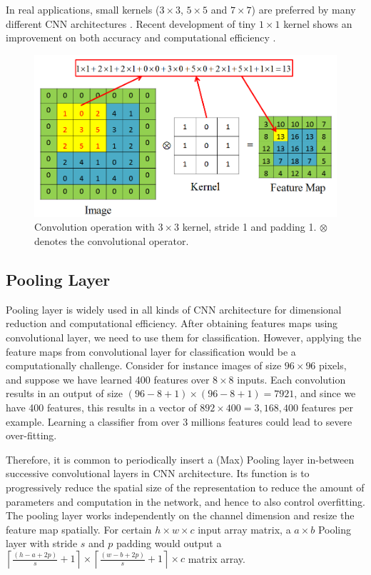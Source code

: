 In real applications, small kernels ($3\times3$, $5\times5$ and $7\times7$) are preferred by many different CNN architectures \cite{krizhevsky2012imagenet} \cite{lecun1998gradient} \cite{simonyan2014very} \cite{zeiler2014visualizing}. Recent development of tiny $1\times1$ kernel shows an improvement on both accuracy and computational efficiency \cite{szegedy2014going}.
\begin{figure}
\centering
\includegraphics[scale=.6]{cnn/fig/conv.png}
\caption{Convolution operation with $3\times3$ kernel, stride 1 and padding 1. $\otimes$ denotes the convolutional operator.} \label{fig:cnn:conv}
\end{figure}

\subsection{Pooling Layer}
Pooling layer is widely used in all kinds of CNN architecture for dimensional reduction and computational efficiency. 
After obtaining features maps using convolutional layer, we need to use them for classification. However, applying the feature maps from convolutional layer for classification would be a computationally challenge. Consider for instance images of size $96\times96$ pixels, and suppose we have learned 400 features over $8\times8$ inputs. Each convolution results in an output of size $(96-8+1)\times(96-8+1)=7921$, and since we have 400 features, this results in a vector of $892\times 400=3,168,400$ features per example. Learning a classifier from over 3 millions features could lead to severe over-fitting.

Therefore, it is common to periodically insert a (Max) Pooling layer in-between successive convolutional layers in CNN architecture. Its function is to progressively reduce the spatial size of the representation to reduce the amount of parameters and computation in the network, and hence to also control overfitting. The pooling layer works independently on the channel dimension and resize the feature map spatially. For certain $h \times w \times c$ input array matrix, a $a \times b$ Pooling layer with stride $s$ and $p$ padding would output a $\left\lceil\frac{(h-a+2p)}{s}+1\right\rceil\times\left\lceil\frac{(w-b+2p)}{s}+1\right\rceil \times c$ matrix array.

